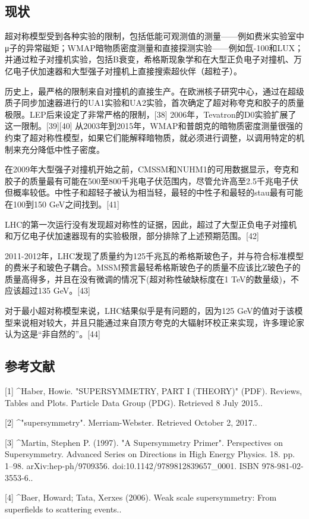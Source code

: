 \subsection{现状}
超对称模型受到各种实验的限制，包括低能可观测值的测量——例如费米实验室中μ子的异常磁矩；WMAP暗物质密度测量和直接探测实验——例如氙-100和LUX；并通过粒子对撞机实验，包括B衰变，希格斯现象学和在大型正负电子对撞机、万亿电子伏加速器和大型强子对撞机上直接搜索超伙伴（超粒子）。

历史上，最严格的限制来自对撞机的直接生产。在欧洲核子研究中心，通过在超级质子同步加速器进行的UA1实验和UA2实验，首次确定了超对称夸克和胶子的质量极限。LEP后来设定了非常严格的限制，[38] 2006年，Tevatron的D0实验扩展了这一限制。[39][40] 从2003年到2015年，WMAP和普朗克的暗物质密度测量很强的约束了超对称性模型，如果它们能解释暗物质，就必须进行调整，以调用特定的机制来充分降低中性子密度。

在2009年大型强子对撞机开始之前，CMSSM和NUHM1的可用数据显示，夸克和胶子的质量最有可能在500至800千兆电子伏范围内，尽管允许高至2.5千兆电子伏但概率较低。中性子和超轻子被认为相当轻，最轻的中性子和最轻的stau最有可能在100到150 GeV之间找到。[41]

LHC的第一次运行没有发现超对称性的证据，因此，超过了大型正负电子对撞机和万亿电子伏加速器现有的实验极限，部分排除了上述预期范围。[42]

2011-2012年，LHC发现了质量约为125千兆瓦的希格斯玻色子，并与符合标准模型的费米子和玻色子耦合。MSSM预言最轻希格斯玻色子的质量不应该比Z玻色子的质量高得多，并且在没有微调的情况下(超对称性破缺标度在1 TeV的数量级)，不应该超过135 GeV。[43]

对于最小超对称模型来说，LHC结果似乎是有问题的，因为125 GeV的值对于该模型来说相对较大，并且只能通过来自顶方夸克的大辐射环校正来实现，许多理论家认为这是“非自然的”。[44]

\subsection{参考文献}
[1]
^Haber, Howie. "SUPERSYMMETRY, PART I (THEORY)" (PDF). Reviews, Tables and Plots. Particle Data Group (PDG). Retrieved 8 July 2015..

[2]
^"supersymmetry". Merriam-Webster. Retrieved October 2, 2017..

[3]
^Martin, Stephen P. (1997). "A Supersymmetry Primer". Perspectives on Supersymmetry. Advanced Series on Directions in High Energy Physics. 18. pp. 1–98. arXiv:hep-ph/9709356. doi:10.1142/9789812839657_0001. ISBN 978-981-02-3553-6..

[4]
^Baer, Howard; Tata, Xerxes (2006). Weak scale supersymmetry: From superfields to scattering events..

